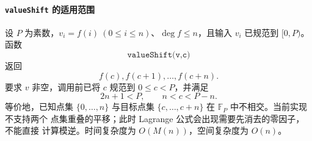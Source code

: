 \paragraph*{\texttt{valueShift} 的适用范围}

设 \(P\) 为素数，\(v_i=f(i)\ (0\le i\le n)\)、\(\deg f\le n\)，且输入
\(v_i\) 已规范到 \([0,P)\)。函数
\[
\texttt{valueShift(v,c)}
\]
返回
\[
f(c),f(c+1),\ldots,f(c+n).
\]
要求 \(v\) 非空，调用前已将 \(c\) 规范到 \(0\le c<P\)，并满足
\[
2n+1<P,\qquad n<c<P-n.
\]
等价地，已知点集 \(\{0,\ldots,n\}\) 与目标点集
\(\{c,\ldots,c+n\}\) 在 \(\mathbb F_P\) 中不相交。当前实现不支持两个
点集重叠的平移；此时 Lagrange 公式会出现需要先消去的零因子，不能直接
计算模逆。时间复杂度为 \(O(M(n))\)，空间复杂度为 \(O(n)\)。
